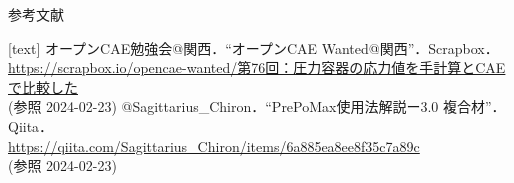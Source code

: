 \begin{frame}{参考文献}
  \begin{thebibliography}{9}
     [text]
      オープンCAE勉強会@関西．“オープンCAE Wanted@関西”．Scrapbox． \\
         {\scriptsize \fontsize{10pt}{10pt}  \color{cud_orange}
          \url{https://scrapbox.io/opencae-wanted/第76回：圧力容器の応力値を手計算とCAEで比較した}} \\
          (参照 2024-02-23)
      @Sagittarius\_Chiron．“PrePoMax使用法解説ー3.0 複合材”．Qiita．\\
           {\footnotesize {} \color{cud_orange}
           \url{https://qiita.com/Sagittarius_Chiron/items/6a885ea8ee8f35c7a89c}} \\
           (参照 2024-02-23)
  \end{thebibliography}
\end{frame}

